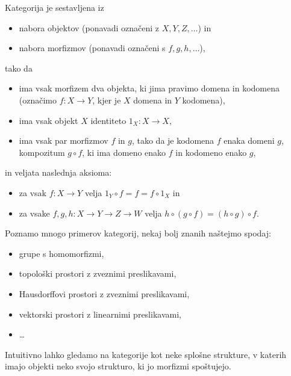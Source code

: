 \begin{definition}
    Kategorija je sestavljena iz
    \begin{itemize}
        \item nabora objektov (ponavadi označeni z \(X,Y,Z,…\)) in
        \item nabora morfizmov (ponavadi označeni s \(f,g,h,…\)),
    \end{itemize}
    tako da
    \begin{itemize}
        \item ima vsak morfizem dva objekta, ki jima pravimo domena in kodomena (označimo \(f : X → Y\), kjer je \(X\) domena in \(Y\) kodomena),
        \item ima vsak objekt \(X\) identiteto \(1_X : X → X\),
        \item ima vsak par morfizmov \(f\) in \(g\), tako da je kodomena \(f\) enaka domeni \(g\), kompozitum \(g∘f\), ki ima domeno enako \(f\) in kodomeno enako \(g\),
    \end{itemize}
    in veljata naslednja aksioma:
    \begin{itemize}
        \item za vsak \(f : X → Y\) velja \(1_Y∘f = f = f∘1_X\) in
        \item za vsake \(f,g,h : X → Y → Z → W\) velja \(h∘(g∘f) = (h∘g)∘f\).
    \end{itemize}
\end{definition}

\begin{examples}
    Poznamo mnogo primerov kategorij, nekaj bolj znanih naštejmo spodaj:
    \begin{itemize}
        \item grupe s homomorfizmi,
        \item topološki prostori z zveznimi preslikavami,
        \item Hausdorffovi prostori z zveznimi preslikavami,
        \item vektorski prostori z linearnimi preslikavami,
        \item …
    \end{itemize}
\end{examples}

Intuitivno lahko gledamo na kategorije kot neke splošne strukture, v katerih imajo objekti neko svojo strukturo, ki jo morfizmi spoštujejo.


